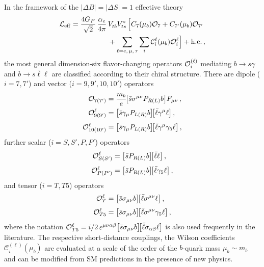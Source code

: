 \documentclass[twocolumn,epjc3]{svjour3}
\numberwithin{equation}{section}
\newcommand{\wilson}[2][{}]{\mathcal{C}_{#2}^{\mathrm{#1}}}
\renewcommand{\[}{\big[}
\renewcommand{\]}{\big]}
\renewcommand{\(}{\big(}
\renewcommand{\)}{\big)}
\def \Op{{\cal O}}
\def \alE{\alpha_e}        %
\begin{document}
In the framework of the $|\Delta B| = |\Delta S| = 1$ effective theory
\begin{equation}
  \label{eq:Heff}
\begin{aligned}
  {\cal L}_{\rm eff}  =
   \frac{4 G_F}{\sqrt{2}} \,\frac{\alE}{4 \pi}\, & V_{tb}^{} V_{ts}^\ast
      \, \Big[ {C_7(\mu_b) \Op_7 + C_{7'}(\mu_b) \Op_{7'}}
 \\ & +
       \sum_{\ell = e,\, \mu,\, \tau} \sum_i  \wilson[\ell]{i}(\mu_b)
       {\Op_i^\ell} \Big] + \text{h.c.}
   {\,,}
\end{aligned}
\end{equation}
the most general dimension-six flavor-changing operators {$\Op_i^{(\ell)}$} mediating $b\to
s \gamma$ and $b\to s \bar\ell\ell$ are classified according to their chiral
structure. There are dipole ($i = 7,7'$) and vector ($i = 9,9',10,10'$) operators
\begin{equation}
  \label{eq:SM:ops}
\begin{aligned}
  \Op_{7(7')} &
  = \frac{m_b}{e}\!\[\bar{s} \sigma^{\mu\nu} P_{R(L)} b\] F_{\mu\nu}\,,
\\
  {\Op_{9(9')}^\ell} &
  = \[\bar{s} \gamma_\mu P_{L(R)} b\]\!\[\bar{\ell} \gamma^\mu \ell\]\,,
\\[0.1cm]
  {\Op_{10(10')}^\ell} &
  = \[\bar{s} \gamma_\mu P_{L(R)} b\]\!\[\bar{\ell} \gamma^\mu \gamma_5 \ell\]\,,
\end{aligned}
\end{equation}
further scalar ($i = S,S',P,P'$) operators
\begin{equation}
  \label{eq:scalar:ops}
\begin{aligned}
  {\Op_{S(S')}^\ell} &
  = \[\bar{s} P_{R(L)} b\]\!\[\bar{\ell} \ell\]\,,
\\[0.1cm]
  {\Op_{P(P')}^\ell} &
  = \[\bar{s} P_{R(L)} b\]\!\[\bar{\ell} \gamma_5 \ell\]\,,
\end{aligned}
\end{equation}
and tensor ($i = T,T5$) operators
\begin{equation}
  \label{eq:tensor:ops}
\begin{aligned}
  {\Op_{T}^\ell} &
  = \[\bar{s} \sigma_{\mu\nu} b\]\!\[\bar{\ell} \sigma^{\mu\nu} \ell\]\,,
\\[0.1cm]
  {\Op_{T5}^\ell} &
  = \[\bar{s} \sigma_{\mu\nu} b\]\!\[\bar{\ell} \sigma^{\mu\nu} \gamma_5 \ell\]\,,
\end{aligned}
\end{equation}
where the notation ${\Op_{T5}^\ell} = i/2\, \varepsilon^{\mu\nu\alpha\beta}
\[\bar{s} \sigma_{\mu\nu} b\]\!\[\bar{\ell} \sigma_{\alpha\beta} \ell\]$ is
also used frequently in the literature. The respective short-distance couplings,
the Wilson coefficients $\wilson[(\ell)]{i}(\mu_b)$ are evaluated at a scale of
the order of the $b$-quark mass $\mu_b \sim m_b$ and can be modified from SM
predictions in the presence of new physics.
\end{document}

